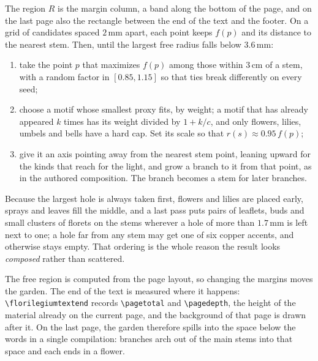 \begin{construction}[Growth]
  The region $R$ is the margin column, a band along the bottom of the
  page, and on the last
  page also the rectangle between the end of the text and the footer.
  On a grid of candidates
  spaced $2\,$mm apart, each point keeps $f(p)$ and its distance to
  the nearest stem. Then,
  until the largest free radius falls below $3.6\,$mm:
  \begin{enumerate}
    \item take the point $p$ that maximizes $f(p)$ among those within
      $3\,$cm of a stem, with
      a random factor in $[0.85,1.15]$ so that ties break differently
      on every seed;
    \item choose a motif whose smallest proxy fits, by weight; a
      motif that has already
      appeared $k$ times has its weight divided by $1+k/c$, and only
      flowers, lilies,
      umbels and bells have a hard cap. Set its scale so that
      $r(s)\approx0.95\,f(p)$;
    \item give it an axis pointing away from the nearest stem point,
      leaning upward for the
      kinds that reach for the light, and grow a branch to it from
      that point, as in the
      authored composition. The branch becomes a stem for later branches.
  \end{enumerate}
  Because the largest hole is always taken first, flowers and lilies
  are placed early,
  sprays and leaves fill the middle, and a last pass puts pairs of
  leaflets, buds and small
  clusters of florets on the stems wherever a hole of more than
  $1.7\,$mm is left next to
  one; a hole far from any stem may get one of six copper accents,
  and otherwise stays empty.
  That ordering is the whole reason the result looks \emph{composed}
  rather than scattered.
\end{construction}

\begin{remark}
  The free region is computed from the page layout, so changing the
  margins moves the
  garden. The end of the text is measured where it happens:
  \verb|\florilegiumtextend|
  records \verb|\pagetotal| and \verb|\pagedepth|, the height of the
  material already on the
  current page, and the background of that page is drawn after it. On
  the last page, the
  garden therefore spills into the space below the words in a single
  compilation: branches
  arch out of the main stems into that space and each ends in a flower.
\end{remark}

